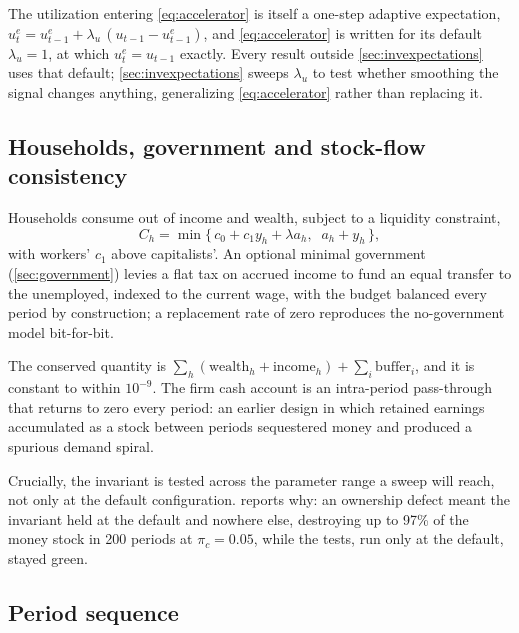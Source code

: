 The utilization entering \cref{eq:accelerator} is itself a one-step adaptive
expectation, $u^e_t = u^e_{t-1} + \lambda_u\,(u_{t-1} - u^e_{t-1})$, and
\cref{eq:accelerator} is written for its default $\lambda_u = 1$, at which
$u^e_t = u_{t-1}$ exactly. Every result outside \cref{sec:invexpectations} uses
that default; \cref{sec:invexpectations} sweeps $\lambda_u$ to test whether
smoothing the signal changes anything, generalizing \cref{eq:accelerator}
rather than replacing it.

\subsection{Households, government and stock-flow consistency}

Households consume out of income and wealth, subject to a liquidity
constraint,
\begin{equation}
  C_h = \min\big\{\, c_0 + c_1 y_h + \lambda a_h,\;\; a_h + y_h \,\big\},
  \label{eq:consumption}
\end{equation}
with workers' $c_1$ above capitalists'. An optional minimal government
(\cref{sec:government}) levies a flat tax on accrued income to fund an equal
transfer to the unemployed, indexed to the current wage, with the budget
balanced every period by construction; a replacement rate of zero reproduces
the no-government model bit-for-bit.

\begin{modelassumption}
The conserved quantity is
$\sum_h (\text{wealth}_h + \text{income}_h) + \sum_i \text{buffer}_i$, and it
is constant to within $10^{-9}$. The firm cash account is an
intra-period pass-through that returns to zero every period: an earlier
design in which retained earnings accumulated as a stock between periods
sequestered money and produced a spurious demand spiral.

Crucially, the invariant is tested across the parameter range a sweep
will reach, not only at the default configuration. 
reports why: an ownership defect meant the invariant held at the default and
nowhere else, destroying up to 97\% of the money stock in 200 periods at
$\pi_c = 0.05$, while the tests, run only at the default, stayed green.
\end{modelassumption}

\subsection{Period sequence}

